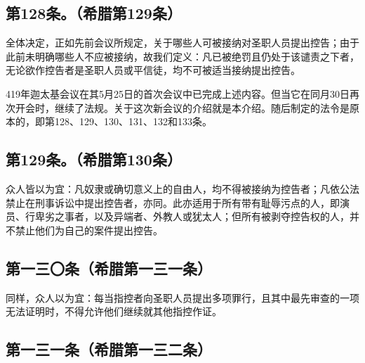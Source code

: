 \subsection{第128条。（希腊第129条）}

\par

全体决定，正如先前会议所规定，关于哪些人可被接纳对圣职人员提出控告；由于此前未明确哪些人不应被接纳，故我们定义：凡已被绝罚且仍处于该谴责之下者，无论欲作控告者是圣职人员或平信徒，均不可被适当接纳提出控告。\par

419年迦太基会议在其5月25日的首次会议中已完成上述内容。但当它在同月30日再次开会时，继续了法规。关于这次新会议的介绍就是本介绍。随后制定的法令是原本的，即第128、129、130、131、132和133条。\par


\subsection{第129条。（希腊第130条）}

\par

众人皆以为宜：凡奴隶或确切意义上的自由人，均不得被接纳为控告者；凡依公法禁止在刑事诉讼中提出控告者，亦同。此亦适用于所有带有耻辱污点的人，即演员、行卑劣之事者，以及异端者、外教人或犹太人；但所有被剥夺控告权的人，并不禁止他们为自己的案件提出控告。\par


\subsection{第一三〇条（希腊第一三一条）}

\par

同样，众人以为宜：每当指控者向圣职人员提出多项罪行，且其中最先审查的一项无法证明时，不得允许他们继续就其他指控作证。\par


\subsection{第一三一条（希腊第一三二条）}

